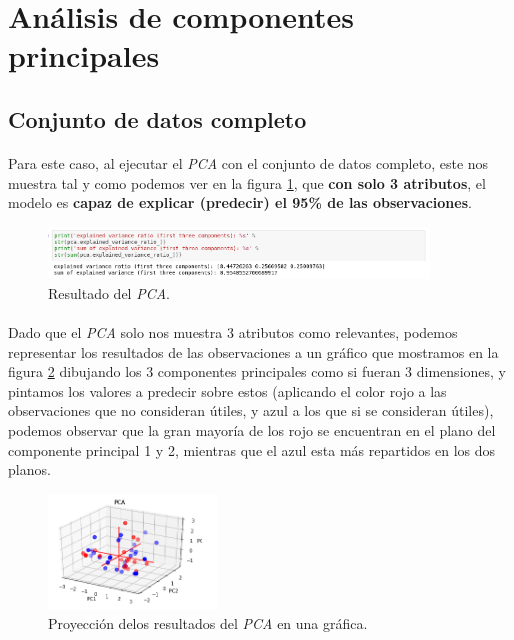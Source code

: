 \section{Análisis de componentes principales}
\label{resultados:pca}

\subsection{Conjunto de datos completo}

\paragraph{}
Para este caso, al ejecutar el \textit{PCA} con el conjunto de datos completo, este nos muestra tal y como podemos ver en la figura \ref{pcaOneResult}, que \textbf{con solo 3 atributos}, el modelo es \textbf{capaz de explicar (predecir) el 95\% de las observaciones}.

\begin{figure}[!htb]
  \centering
    \includegraphics[width=0.9\textwidth]{images/resultados_procesado_de_datos_pca1_result.png}
    \caption{Resultado del \textit{PCA}.}
  \label{pcaOneResult}
\end{figure}

\paragraph{}
Dado que el \textit{PCA} solo nos muestra 3 atributos como relevantes, podemos representar los resultados de las observaciones a un gráfico que mostramos en la figura \ref{pcaOneGraphic} dibujando los 3 componentes principales como si fueran 3 dimensiones, y pintamos los valores a predecir sobre estos (aplicando el color rojo a las observaciones que no consideran útiles, y azul a los que si se consideran útiles), podemos observar que la gran mayoría de los rojo se encuentran en el plano del componente principal 1 y 2, mientras que el azul esta más repartidos en los dos planos.

\begin{figure}[!htb]
  \centering
    \includegraphics[width=0.4\textwidth]{images/resultados_procesado_de_datos_pca1_graphic.png}
    \caption{Proyección delos resultados del \textit{PCA} en una gráfica.}
  \label{pcaOneGraphic}
\end{figure}

